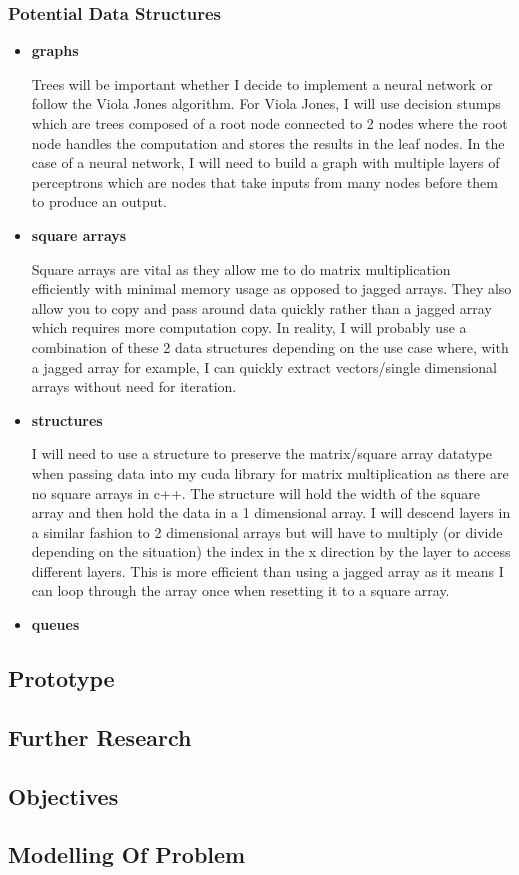 \subsubsection{\textbf{Potential Data Structures}}
\begin{itemize}
    \item \textbf{graphs}
    \par
    Trees will be important whether I decide to implement a neural network or follow the Viola Jones algorithm. For Viola Jones, I will use decision stumps which are trees composed of a root node connected to 2 nodes where the root node handles the computation and stores the results in the leaf nodes. In the case of a neural network, I will need to build a graph with multiple layers of perceptrons which are nodes that take inputs from many nodes before them to produce an output.
    \item \textbf{square arrays}
    \par
    Square arrays are vital as they allow me to do matrix multiplication efficiently with minimal memory usage as opposed to jagged arrays. They also allow you to copy and pass around data quickly rather than a jagged array which requires more computation copy. In reality, I will probably use a combination of these 2 data structures depending on the use case where, with a jagged array for example, I can quickly extract vectors/single dimensional arrays without need for iteration.
    \item \textbf{structures}
    \par
    I will need to use a structure to preserve the matrix/square array datatype when passing data into my cuda library for matrix multiplication as there are no square arrays in c++. The structure will hold the width of the square array and then hold the data in a 1 dimensional array. I will descend layers in a similar fashion to 2 dimensional arrays but will have to multiply (or divide depending on the situation) the index in the x direction by the layer to access different layers. This is more efficient than using a jagged array as it means I can loop through the array once when resetting it to a square array.
    \item \textbf{queues}
\end{itemize}



\subsection{Prototype}


\subsection{Further Research}


\subsection{Objectives}


\subsection{Modelling Of Problem}

